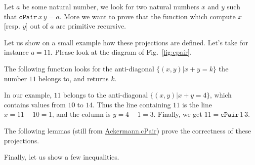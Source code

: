       Let $a$ be some natural number, we look for two natural numbers $x$ and $y$ such that $\texttt{cPair}\,x\,y=a$. More we want to prove that the function which compute $x$ [resp. $y$] out of $a$ are primitive recursive.

      Let us show on a small example how these projections are defined. Let's take for instance $a=11$. Please look at the diagram of Fig.~\ref{fig:cpair}.

      The following function looks for the anti-diagonal $\{(x,y)|x+y=k\}$ the number $11$ belongs to, and returns $k$.

      
      In our example, $11$ belongs to the anti-diagonal $\{(x,y)|x+y=4\}$, which contains values from $10$ to $14$.
      Thus the line containing $11$ is the line $x=11-10=1$, and the column is $y=4-1= 3$. Finally, we get  $11=\texttt{cPair}\,1\,3$.


       The following lemmas (still from \href{../theories/html/hydras.Ackermann.cPair.html}{Ackermann.cPair}) prove the correctness of these projections.

       
       Finally, let us show a few inequalities.


      
